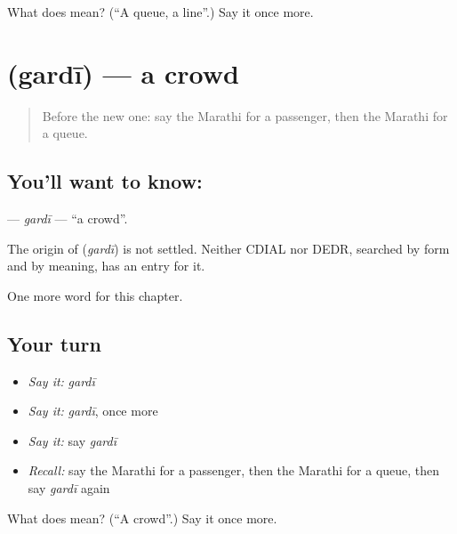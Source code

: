 \begin{tcolorbox}[breakable,colback=teal!4,colframe=teal!35!black,title={Before you move on}]
What does  mean? (\textquotedblleft{}A queue, a line\textquotedblright{}.) Say it once more.
\end{tcolorbox}
\section[\texorpdfstring{\mr{गर्दी} (gardī)}{गर्दी (gardī)}]{ (gardī) — a crowd}

\label{lesson:MR-C190-gardi}



\begin{quote}
Before the new one: say the Marathi for a passenger, then the Marathi for a queue.
\end{quote}

\subsection*{You'll want to know: }
\textbf{} — \emph{gardī} — \textquotedblleft{}a crowd\textquotedblright{}.

\begin{cousinweb}
The origin of \textbf{} (\emph{gardī}) is not settled. Neither CDIAL nor DEDR, searched by form and by meaning, has an entry for it.
\end{cousinweb}

\begin{grammarlens}[title={What you've built}]
One more word for this chapter.
\end{grammarlens}

\subsection*{Your turn}
\begin{itemize}
\raggedright
  \item \emph{Say it:} \emph{gardī}
  \item \emph{Say it:} \emph{gardī}, once more
  \item \emph{Say it:} say \emph{gardī}
  \item \emph{Recall:} say the Marathi for a passenger, then the Marathi for a queue, then say \emph{gardī} again
\end{itemize}

\begin{tcolorbox}[breakable,colback=teal!4,colframe=teal!35!black,title={Before you move on}]
What does  mean? (\textquotedblleft{}A crowd\textquotedblright{}.) Say it once more.
\end{tcolorbox}
